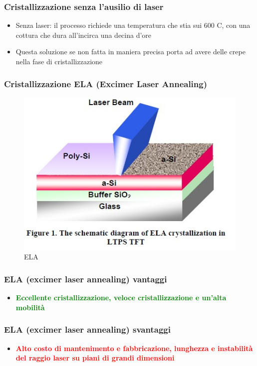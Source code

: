 \documentclass[12pt]{beamer}
\begin{document}
	\begin{frame}
		\frametitle{Cristallizzazione senza l'ausilio di laser}
		\begin{itemize}
			\item Senza laser: il processo richiede una temperatura che stia sui 600 \degree C, con una cottura che dura all'incirca una decina d'ore
			\pause
			\item Questa soluzione se non fatta in maniera precisa porta ad avere delle crepe nella fase di cristallizzazione
		\end{itemize}
	\end{frame}
	\begin{frame}
		\frametitle{Cristallizzazione ELA (Excimer Laser Annealing)}
			\begin{figure}
				\centering
				\includegraphics[width=1\linewidth]{"FISICA/ELA cristallizzazione"}
				\caption{ELA}
				\label{fig:ela-cristallizzazione}
			\end{figure}
	\end{frame}
	\begin{frame}
		\frametitle{ELA (excimer laser annealing) vantaggi}
		\begin{itemize}
			\item \textbf{\textcolor{green}{Eccellente cristallizzazione, veloce cristallizzazione e un'alta mobilità}}
		\end{itemize}
	\end{frame}
	\begin{frame}
		\frametitle{ELA (excimer laser annealing) svantaggi}
		\begin{itemize}
			\item \textbf{\textcolor{red}{Alto costo di mantenimento e fabbricazione, lunghezza e instabilità del raggio laser su piani di grandi dimensioni}}
		\end{itemize}
	\end{frame}
\end{document}
